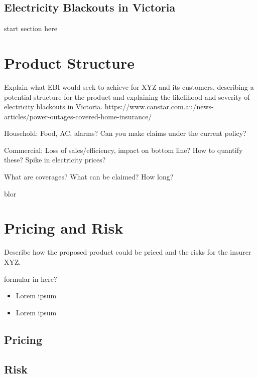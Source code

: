 \documentclass[12pt]{article}
\begin{document}
\subsection{Electricity Blackouts in Victoria}
\begin{flushleft}
start section here
\end{flushleft}
\newpage


\section{Product Structure}
\begin{flushleft}
Explain what EBI would seek to achieve for XYZ and its customers, describing a potential 
structure for the product and explaining the likelihood and severity of electricity blackouts in Victoria.
https://www.canstar.com.au/news-articles/power-outages-covered-home-insurance/ \par
Household: Food, AC, alarms? Can you make claims under the current policy? \par
Commercial: Loss of sales/efficiency, impact on bottom line? How to quantify these? Spike in electricity prices?\par
What are coverages? What can be claimed? How long?  
\end{flushleft}

\fullboxbegin
blor
\fullboxend


\section{Pricing and Risk}
Describe how the proposed product could be priced and the risks for the insurer XYZ. 

\leftboxbegin
formular in here?
\leftboxend

\lipsum[1]

\rightboxbegin
\begin{itemize}
 \item Lorem ipsum
 \item Lorem ipsum
\end{itemize}
\rightboxend

\lipsum[1]

\subsection{Pricing}
\lipsum[1]

\subsection{Risk}
\lipsum[1]
\end{document}
